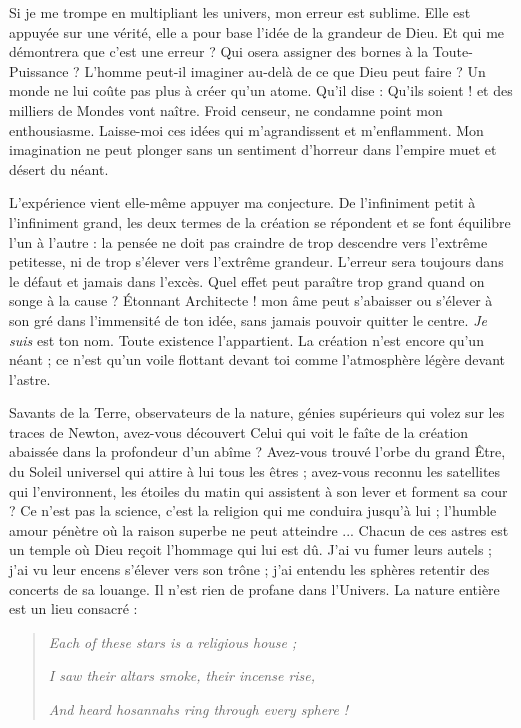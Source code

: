 \documentclass[a4paper, 11pt, oneside]{article}
\begin{document}
Si je me trompe en multipliant les univers, mon erreur est sublime. Elle est appuyée sur une vérité, elle a pour base l'idée de la grandeur de Dieu. Et qui me démontrera que c'est une erreur ? Qui osera assigner des bornes à la Toute-Puissance ? L'homme peut-il imaginer au-delà de ce que Dieu peut faire ? Un monde ne lui coûte pas plus à créer qu'un atome. Qu'il dise : Qu'ils soient ! et des milliers de Mondes vont naître. Froid censeur, ne condamne point mon enthousiasme. Laisse-moi ces idées qui m'agrandissent et m'enflamment. Mon imagination ne peut plonger sans un sentiment d'horreur dans l'empire muet et désert du néant.

L'expérience vient elle-même appuyer ma conjecture. De l'infiniment petit à l'infiniment grand, les deux termes de la création se répondent et se font équilibre l'un à l'autre : la pensée ne doit pas craindre de trop descendre vers l'extrême petitesse, ni de trop s'élever vers l'extrême grandeur. L'erreur sera toujours dans le défaut et jamais dans l'excès. Quel effet peut paraître trop grand quand on songe à la cause ? Étonnant Architecte ! mon âme peut s'abaisser ou s'élever à son gré dans l'immensité de ton idée, sans jamais pouvoir quitter le centre. \emph{Je suis} est ton nom. Toute existence l'appartient. La création n'est encore qu'un néant ; ce n'est qu'un voile flottant devant toi comme l'atmosphère légère devant l'astre.

Savants de la Terre, observateurs de la nature, génies supérieurs qui volez sur les traces de Newton, avez-vous découvert Celui qui voit le faîte de la création abaissée dans la profondeur d'un abîme ? Avez-vous trouvé l'orbe du grand Être, du Soleil universel qui attire à lui tous les êtres ; avez-vous reconnu les satellites qui l'environnent, les étoiles du matin qui assistent à son lever et forment sa cour ? Ce n'est pas la science, c'est la religion qui me conduira jusqu'à lui ; l'humble amour pénètre où la raison superbe ne peut atteindre ... Chacun de ces astres est un temple où Dieu reçoit l'hommage qui lui est dû. J'ai vu fumer leurs autels ; j'ai vu leur encens s'élever vers son trône ; j'ai entendu les sphères retentir des concerts de sa louange. Il n'est rien de profane dans l'Univers. La nature entière est un lieu consacré :
\begin{quotation}
\normalsize
\emph{Each of these stars is a religious house ;}

\emph{I saw their altars smoke, their incense rise,}

\emph{And heard hosannahs ring through every sphere !}
\end{quotation}
\end{document}
